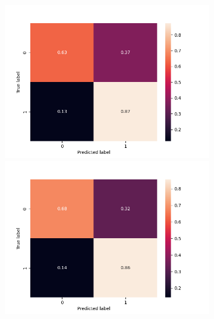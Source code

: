 \begin{figure}
\begin{subfigure}[b]{\textwidth}
      \includegraphics[width=\linewidth]{figures/results/word_embeddings/nn/calibrate/calibrate_set_4_confusion_matrix_percent.png}
    \endminipage\hfill
    \includegraphics[width=\linewidth]{figures/results/word_embeddings/nn/calibrate/calibrate_set_5_confusion_matrix_percent.png}
    \endminipage\hfill

\end{subfigure}
\end{figure}
